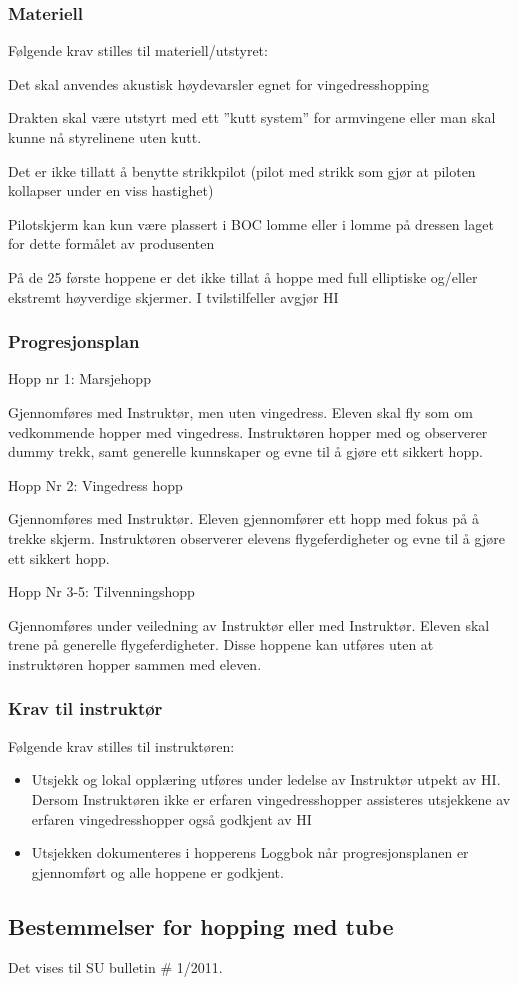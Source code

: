 \subsubsection{Materiell}
Følgende krav stilles til materiell/utstyret:

Det skal anvendes akustisk høydevarsler egnet for vingedresshopping

Drakten skal være utstyrt med ett ”kutt system” for armvingene eller man skal kunne nå styrelinene uten kutt.

Det er ikke tillatt å benytte strikkpilot (pilot med strikk som gjør at piloten kollapser under en viss hastighet)

Pilotskjerm kan kun være plassert i BOC lomme eller i lomme på dressen laget for dette formålet av produsenten

På de 25 første hoppene er det ikke tillat å hoppe med full elliptiske og/eller ekstremt høyverdige skjermer. I tvilstilfeller avgjør HI

\subsubsection{Progresjonsplan}
Hopp nr 1: Marsjehopp

Gjennomføres med Instruktør, men uten vingedress. Eleven skal fly som om vedkommende hopper med vingedress. Instruktøren hopper med og observerer dummy trekk, samt generelle kunnskaper og evne til å gjøre ett sikkert hopp.

Hopp Nr 2: Vingedress hopp

Gjennomføres med Instruktør. Eleven gjennomfører ett hopp med fokus på å trekke skjerm. Instruktøren observerer elevens flygeferdigheter og evne til å gjøre ett sikkert hopp.

Hopp Nr 3-5: Tilvenningshopp

Gjennomføres under veiledning av Instruktør eller med Instruktør. Eleven skal trene på generelle flygeferdigheter. Disse hoppene kan utføres uten at instruktøren hopper sammen med eleven.

\subsubsection{Krav til instruktør}
Følgende krav stilles til instruktøren:
\begin{itemize}
	\item Utsjekk og lokal opplæring utføres under ledelse av Instruktør utpekt av HI. Dersom Instruktøren ikke er erfaren vingedresshopper assisteres utsjekkene av erfaren vingedresshopper også godkjent av HI
	\item Utsjekken dokumenteres i hopperens Loggbok når progresjonsplanen er gjennomført og alle hoppene er godkjent.
\end{itemize}

\subsection{Bestemmelser for hopping med tube}
Det vises til SU bulletin \# 1/2011.
